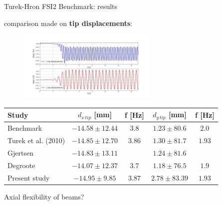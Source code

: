 \documentclass[10pt,t]{beamer}
\begin{document}
\begin{frame}{Turek-Hron FSI2 Benchmark: results}

comparison made on \textbf{tip displacements}:
\begin{figure}[htbp!]
	\centering
	\includegraphics[width=0.6\textwidth, trim=20 20 20 50, clip]{images/FSI2/disp_fsi2.png}
\end{figure}


\footnotesize
\begin{center}
\begin{tabular}{ l | c c | c c  |  } 
	Study & $d_{x\,tip}$ [\si{mm}] & f [\si{Hz}] & $d_{y\,tip}$ [\si{mm}] & f [\si{Hz}] \\ 
	\hline
	\hline
	Benchmark & $-14.58\pm12.44$ & $3.8$ & $1.23\pm80.6$ & $2.0$ \\
	Turek et al. (2010) & $-14.85\pm12.70$ & $3.86$ & $1.30\pm81.7$ & $1.93$ \\
	Gjertsen & $-14.83\pm13.11$ & & $1.24\pm81.6$ & \\
	Degroote & $-14.07\pm12.37$ & $3.7$ & $1.18\pm76.5$ & $1.9$ \\
	\hline
	Present study & $-14.95\pm9.85$ & $3.87$ & $2.78\pm83.39$ & $1.93$ \\ 
\end{tabular}
    
\end{center}
\vspace{0.2cm}
Axial flexibility of beams?

\end{frame}
\end{document}
